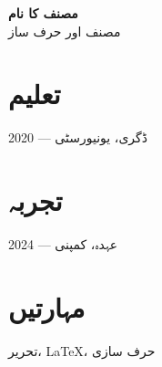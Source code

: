 \documentclass[11pt]{article}
\begin{document}
{\Large\bfseries مصنف کا نام}\\[4pt]
{\large مصنف اور حرف ساز}

\vspace{8pt}

\section*{تعلیم}
2020 — ڈگری، یونیورسٹی

\section*{تجربہ}
2024 — عہدہ، کمپنی

\section*{مہارتیں}
تحریر، LaTeX، حرف سازی
\end{document}
